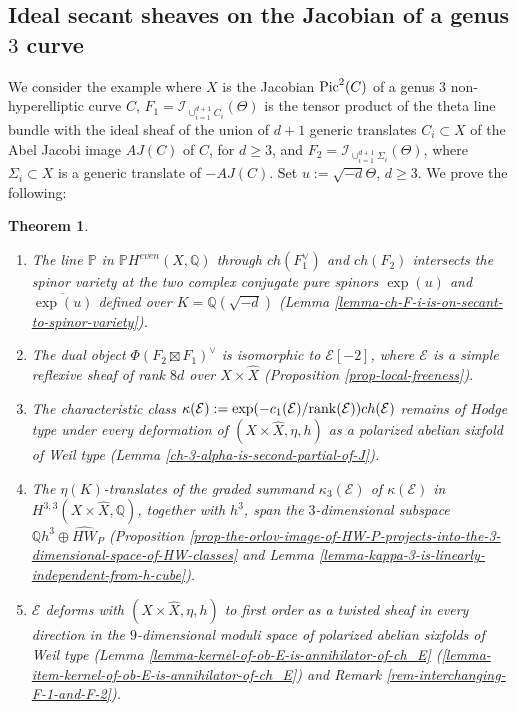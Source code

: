 \documentclass[12pt]{amsart}
\numberwithin{equation}{subsection}
\theoremstyle{plain}
\newtheorem{thm}{Theorem}[subsection]
\theoremstyle{definition}
\newcommand{\E}{{\mathcal E}}
\newcommand{\QQ}{{\mathbb Q}}
\newcommand{\PP}{{\mathbb P}}
\newcommand{\rank}{{\rm rank}}
\newcommand{\Pic}{{\rm Pic}}
\newcommand{\Ideal}[1]{{\mathcal I}_{#1}}
\begin{document}
\subsection{Ideal secant sheaves on the Jacobian of a genus $3$ curve}
We consider the example where $X$ is the Jacobian $\Pic^2(C)$ of a genus $3$ non-hyperelliptic curve $C$,  $F_1=\Ideal{\cup_{i=1}^{d+1}C_i}(\Theta)$ is the tensor product of the theta line bundle with the ideal sheaf of the union of $d+1$ generic translates $C_i\subset X$ of the Abel Jacobi image $AJ(C)$ of $C$, for $d\geq 3$, and 
$F_2=\Ideal{\cup_{i=1}^{d+1}\Sigma_i}(\Theta)$, where $\Sigma_i\subset X$ is a generic translate of $-AJ(C)$. 
Set $u:=\sqrt{-d}\Theta$, $d\geq 3$. 
We prove the following:
\begin{thm}
\label{main-theorem-introduction}
\begin{enumerate}
\item
The line $\PP$ in $\PP{H^{even}(X,\QQ)}$ through $ch(F_1^\vee)$ and $ch(F_2)$ intersects the spinor variety at the two complex conjugate pure spinors $\exp(u)$ and $\overline{\exp(u)}$
defined over $K=\QQ(\sqrt{-d})$ (Lemma \ref{lemma-ch-F-i-is-on-secant-to-spinor-variety}). 
\item
The dual object 
$\Phi(F_2\boxtimes F_1)^\vee$ is isomorphic to $\E[-2]$, where $\E$ is a simple reflexive sheaf of rank $8d$ over $X\times\hat{X}$ (Proposition \ref{prop-local-freeness}). 
\item
The characteristic class $\kappa(\E):=\exp(-c_1(\E)/\rank(\E))ch(\E)$ remains of Hodge type under every deformation of $(X\times\hat{X},\eta,h)$ as a polarized abelian sixfold of Weil type (Lemma \ref{ch-3-alpha-is-second-partial-of-J}).
\item 
\label{thm-item-K-translates-of-kappa-3-and-h-cube-span-HW}
The $\eta(K)$-translates of the graded summand $\kappa_3(\E)$ of $\kappa(\E)$ in $H^{3,3}(X\times \hat{X},\QQ)$, together with $h^3$, span the $3$-dimensional subspace $\QQ h^3\oplus \hat{HW}_P$ 
(Proposition \ref{prop-the-orlov-image-of-HW-P-projects-into-the-3-dimensional-space-of-HW-classes} and Lemma \ref{lemma-kappa-3-is-linearly-independent-from-h-cube}). 
\item
\label{item-P-E-deforms-to-first-order}
$\E$ deforms with $(X\times\hat{X},\eta,h)$ to first order as a twisted sheaf in every direction in the $9$-dimensional moduli space of   
polarized abelian sixfolds of Weil type (Lemma \ref{lemma-kernel-of-ob-E-is-annihilator-of-ch_E}
(\ref{lemma-item-kernel-of-ob-E-is-annihilator-of-ch_E}) and Remark \ref{rem-interchanging-F-1-and-F-2}).
\end{enumerate}
\end{thm}
\end{document}
